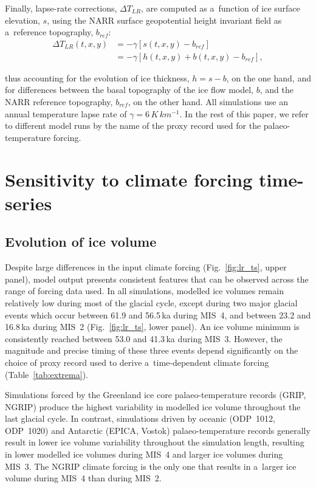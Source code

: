 \documentclass[tc, manuscript]{copernicus}
\begin{document}
      Finally, lapse-rate corrections, ${\Delta}T_{LR}$, are computed as
      a~function of ice surface elevation, $s$, using the NARR surface
      geopotential height invariant field as a~reference topography,
      $b_{ref}$:
\begin{align}
    {\Delta}T_{LR}(t, x, y) &= -\gamma [s(t, x, y)-b_{ref}] \\
                            &= -\gamma [h(t, x, y)+b(t, x, y)-b_{ref}],
\end{align}

      thus accounting for the evolution of ice thickness, ${h=s-b}$, on the
      one hand, and for differences between the basal topography of the ice
      flow model, $b$, and the NARR reference topography, $b_{ref}$, on the
      other hand. All simulations use an annual temperature lapse rate of
      $\gamma = 6\,\unit{K\,km^{-1}}$. In the rest of this paper, we refer
      to different model runs by the name of the proxy record used for the
      palaeo-temperature forcing.

\section{Sensitivity to climate forcing time-series}
\label{sec:results}

\subsection{Evolution of ice volume}

      Despite large differences in the input climate forcing
      (Fig.~\ref{fig:lr_ts}, upper panel), model output presents consistent
      features that can be observed across the range of forcing data used.
      In all simulations, modelled ice volumes remain relatively low during
      most of the glacial cycle, except during two major glacial events
      which occur between 61.9 and 56.5\,\unit{ka} during MIS~4, and between
      23.2 and 16.8\,\unit{ka} during MIS~2 (Fig.~\ref{fig:lr_ts}, lower
      panel). An ice volume minimum is consistently reached between 53.0 and
      41.3\,\unit{ka} during MIS~3. However, the magnitude and precise
      timing of these three events depend significantly on the choice of
      proxy record used to derive a~time-dependent climate forcing
      (Table~\ref{tab:extrema}).

      Simulations forced by the Greenland ice core palaeo-temperature
      records (GRIP, NGRIP) produce the highest variability in modelled ice
      volume throughout the last glacial cycle. In contrast, simulations
      driven by oceanic (ODP~1012, ODP~1020) and Antarctic (EPICA, Vostok)
      palaeo-temperature records generally result in lower ice volume
      variability throughout the simulation length, resulting in lower
      modelled ice volumes during MIS~4 and larger ice volumes during MIS~3.
      The NGRIP climate forcing is the only one that results in a~larger ice
      volume during MIS~4 than during MIS~2.
\end{document}
